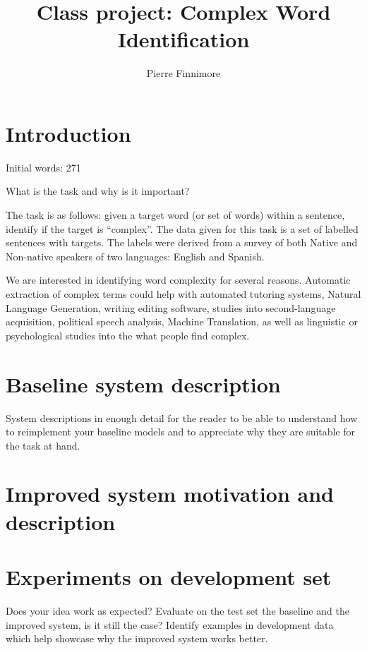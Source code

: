 \documentclass[11pt,a4paper]{article}
\title{Class project: Complex Word Identification}
\author{Pierre Finnimore}
\date{}
\begin{document}
\maketitle
\begin{abstract}

\end{abstract}

\section{Introduction}

Initial words: 271

What is the task and why is it important?

The task is as follows: given a target word (or set of words) within a sentence, identify if the target is \enquote{complex}. The data given for this task is a set of labelled sentences with targets. The labels were derived from a survey of both Native and Non-native speakers of two languages: English and Spanish.

We are interested in identifying word complexity for several reasons. Automatic extraction of complex terms could help with automated tutoring systems, Natural Language Generation, writing editing software, studies into second-language acquisition, political speech analysis, Machine Translation, as well as linguistic or psychological studies into the what people find complex. 

\section{Baseline system description}

System descriptions in enough detail for the reader to be able to understand how to reimplement your baseline models and to appreciate why they are suitable for the task at hand.

\section{Improved system motivation and description}



\section{Experiments on development set}

Does your idea work as expected? Evaluate on the test set the baseline and the improved system, is it still the case? Identify examples in development data which help showcase why the improved system works better.
\end{document}
